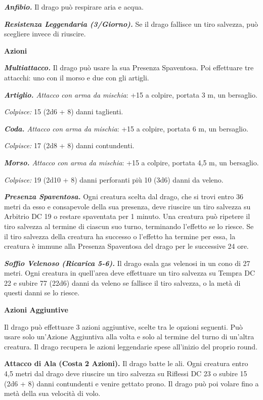 \begin{multicols}{2}
\emph{\textbf{Anfibio.}} Il drago può respirare aria e acqua.

\emph{\textbf{Resistenza Leggendaria (3/Giorno).}} Se il drago fallisce
un tiro salvezza, può scegliere invece di riuscire.

\smallskip\textbf{Azioni}

\emph{\textbf{Multiattacco.}} Il drago può usare la sua Presenza
Spaventosa. Poi effettuare tre attacchi: uno con il morso e due con gli
artigli.

\emph{\textbf{Artiglio.} Attacco con arma da mischia}: +15 a colpire,
portata 3 m, un bersaglio.

\emph{Colpisce:} 15 (2d6 + 8) danni taglienti.

\emph{\textbf{Coda.} Attacco con arma da mischia}: +15 a colpire,
portata 6 m, un bersaglio.

\emph{Colpisce:} 17 (2d8 + 8) danni contundenti.

\emph{\textbf{Morso.} Attacco con arma da mischia}: +15 a colpire,
portata 4,5 m, un bersaglio.

\emph{Colpisce:} 19 (2d10 + 8) danni perforanti più 10 (3d6) danni da
veleno.

\emph{\textbf{Presenza Spaventosa.}} Ogni creatura scelta dal drago, che
si trovi entro 36 metri da esso e consapevole della sua presenza, deve
riuscire un tiro salvezza su Arbitrio DC 19 o restare spaventata per 1
minuto. Una creatura può ripetere il tiro salvezza al termine di ciascun
suo turno, terminando l'effetto se lo riesce. Se il tiro salvezza della
creatura ha successo o l'effetto ha termine per essa, la creatura è
immune alla Presenza Spaventosa del drago per le successive 24 ore.

\emph{\textbf{Soffio Velenoso (Ricarica 5-6).}} Il drago esala gas
velenosi in un cono di 27 metri. Ogni creatura in quell'area deve
effettuare un tiro salvezza su Tempra DC 22 e subire 77 (22d6)
danni da veleno se fallisce il tiro salvezza, o la metà di questi danni
se lo riesce.

\textbf{Azioni Aggiuntive}

Il drago può effettuare 3 azioni aggiuntive, scelte tra le opzioni
seguenti. Può usare solo un'Azione Aggiuntiva alla volta e solo al
termine del turno di un'altra creatura. Il drago recupera le azioni
leggendarie spese all'inizio del proprio round.

\textbf{Attacco di Ala (Costa 2 Azioni).} Il drago batte le ali. Ogni
creatura entro 4,5 metri dal drago deve riuscire un tiro salvezza su Riflessi DC 23 o subire 15 (2d6 + 8) danni contundenti e venire gettato
prono. Il drago può poi volare fino a metà della sua velocità di volo.


\end{multicols}
